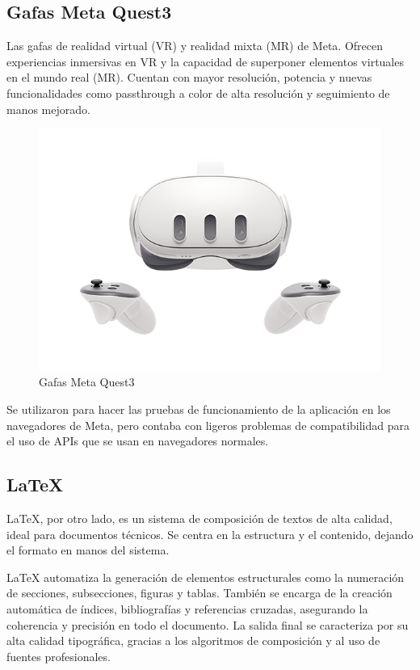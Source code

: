 \documentclass[a4paper, 12pt]{book}
\begin{document}
\subsection{Gafas Meta Quest3}
Las gafas de realidad virtual (VR) y realidad mixta (MR) de Meta. 
Ofrecen experiencias inmersivas en VR y la capacidad de superponer elementos virtuales en el mundo real (MR). 
Cuentan con mayor resolución, potencia y nuevas funcionalidades como passthrough a color de alta resolución y seguimiento de manos mejorado. 
\begin{figure}[H]  %
  \centering
  \includegraphics[width=0.8\linewidth]{img/Quest3.png}  %
  \caption{Gafas Meta Quest3}  %
  \label{fig:Quest3}  %
\end{figure}
Se utilizaron para hacer las pruebas de funcionamiento de la aplicación en los navegadores de Meta, pero contaba con ligeros problemas de compatibilidad para el uso de APIs que se usan en navegadores normales.
\subsection{LaTeX}

LaTeX, por otro lado, es un sistema de composición de textos de alta calidad, ideal para documentos técnicos. Se centra en la estructura y el contenido, dejando el formato en manos del sistema.

LaTeX automatiza la generación de elementos estructurales como la numeración de secciones, subsecciones, figuras y tablas. También se encarga de la creación automática de índices, bibliografías y referencias cruzadas, asegurando la coherencia y precisión en todo el documento. La salida final se caracteriza por su alta calidad tipográfica, gracias a los algoritmos de composición y al uso de fuentes profesionales.
\end{document}
